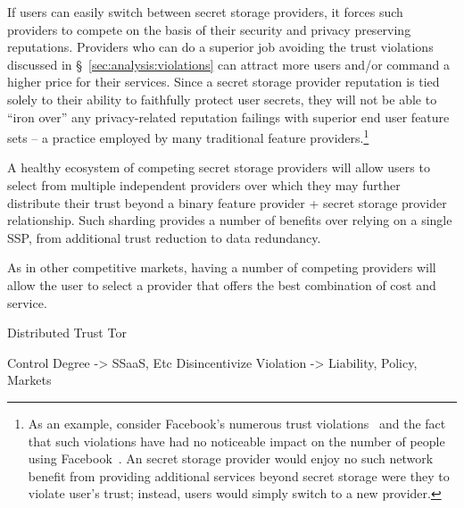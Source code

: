 \begin{packed_desc}
\item[Reputation:] If users can easily switch between secret storage
  providers, it forces such providers to compete on the basis of their
  security and privacy preserving reputations. Providers who can do a
  superior job avoiding the trust violations discussed in
  \S~\ref{sec:analysis:violations} can attract more users and/or
  command a higher price for their services. Since a secret storage
  provider reputation is tied solely to their ability to faithfully
  protect user secrets, they will not be able to ``iron over'' any
  privacy-related reputation failings with superior end user feature
  sets -- a practice employed by many traditional feature
  providers.\footnote{As an example, consider Facebook's numerous
    trust violations~\cite{goel2014, lomas2014, tsukayama2014} and the
    fact that such violations have had no noticeable impact on the
    number of people using Facebook~\cite{foster2014}. An secret
    storage provider would enjoy no such network benefit from
    providing additional services beyond secret storage were they to
    violate user's trust; instead, users would simply switch to a new
    provider.}
\item[Multiple Providers:] A healthy ecosystem of competing secret
  storage providers will allow users to select from multiple
  independent providers over which they may further distribute their
  trust beyond a binary feature provider + secret storage provider
  relationship. Such sharding provides a number of benefits over
  relying on a single SSP, from additional trust reduction to data
  redundancy.
\item[Cost:] As in other competitive markets, having a number of
  competing providers will allow the user to select a provider that
  offers the best combination of cost and service.
\end{packed_desc}


Distributed Trust Tor

Control Degree -> SSaaS, Etc
Disincentivize Violation -> Liability, Policy, Markets

